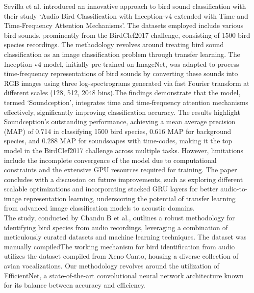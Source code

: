 Sevilla et al.\cite{sevilla2017audio} introduced an innovative approach to bird
sound classification with their study `Audio Bird Classification with
Inception-v4 extended with Time and Time-Frequency Attention Mechanisms'. The
datasets employed include various bird sounds, prominently from the
BirdClef2017 challenge, consisting of 1500 bird species recordings. The
methodology revolves around treating bird sound classification as an image
classification problem through transfer learning. The Inception-v4 model,
initially pre-trained on ImageNet, was adapted to process time-frequency
representations of bird sounds by converting these sounds into RGB images using
three log-spectrograms generated via fast Fourier transform at different scales
(128, 512, 2048 bins).The findings demonstrate that the model, termed
`Soundception', integrates time and time-frequency attention mechanisms
effectively, significantly improving classification accuracy. The results
highlight Soundception's outstanding performance, achieving a mean average
precision (MAP) of 0.714 in classifying 1500 bird species, 0.616 MAP for
background species, and 0.288 MAP for soundscapes with time-codes, making it
the top model in the BirdClef2017 challenge across multiple tasks. However,
limitations include the incomplete convergence of the model due to
computational constraints and the extensive GPU resources required for
training. The paper concludes with a discussion on future improvements, such as
exploring different scalable optimizations and incorporating stacked GRU layers
for better audio-to-image representation learning, underscoring the potential
of transfer learning from advanced image classification models to acoustic
domains.\\

The study, conducted by Chandu B et al.\cite{chandu2020automated}, outlines a
robust methodology for identifying bird species from audio recordings,
leveraging a combination of meticulously curated datasets and machine learning
techniques. The dataset was manually compiledThe working mechanism for bird
identification from audio utilizes the dataset compiled from Xeno Canto,
housing a diverse collection of avian vocalizations. Our methodology revolves
around the utilization of EfficientNet, a state-of-the-art convolutional neural
network architecture known for its balance between accuracy and efficiency.

